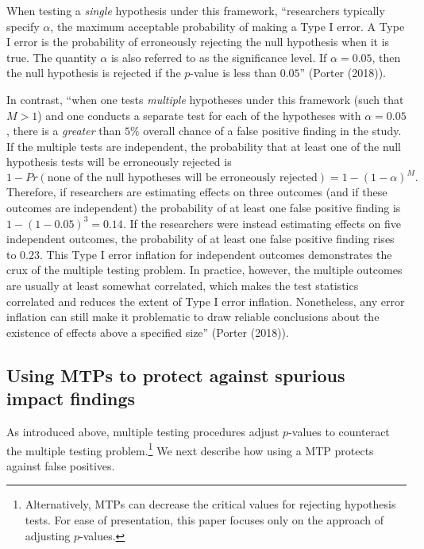 \documentclass[
]{article}
\begin{document}
When testing a \emph{single} hypothesis under this framework,
``researchers typically specify \(\alpha\), the maximum acceptable
probability of making a Type I error. A Type I error is the probability
of erroneously rejecting the null hypothesis when it is true. The
quantity \(\alpha\) is also referred to as the significance level. If
\(\alpha=0.05\), then the null hypothesis is rejected if the \(p\)-value
is less than \(0.05\)'' (Porter (2018)).

In contrast, ``when one tests \emph{multiple} hypotheses under this
framework (such that \(M>1\)) and one conducts a separate test for each
of the hypotheses with \(\alpha=0.05\), there is a \emph{greater} than
\(5\%\) overall chance of a false positive finding in the study. If the
multiple tests are independent, the probability that at least one of the
null hypothesis tests will be erroneously rejected is
\[1-Pr(\text{none of the null hypotheses will be erroneously rejected}) = 1-(1-\alpha)^M.\]
Therefore, if researchers are estimating effects on three outcomes (and
if these outcomes are independent) the probability of at least one false
positive finding is \(1-(1-0.05)^3=0.14\). If the researchers were
instead estimating effects on five independent outcomes, the probability
of at least one false positive finding rises to \(0.23\). This Type I
error inflation for independent outcomes demonstrates the crux of the
multiple testing problem. In practice, however, the multiple outcomes
are usually at least somewhat correlated, which makes the test
statistics correlated and reduces the extent of Type I error inflation.
Nonetheless, any error inflation can still make it problematic to draw
reliable conclusions about the existence of effects above a specified
size'' (Porter (2018)).

\subsection{Using MTPs to protect against spurious impact findings}
\label{sec:mtp_use}

As introduced above, multiple testing procedures adjust \(p\)-values to
counteract the multiple testing problem.\footnote{Alternatively, MTPs
  can decrease the critical values for rejecting hypothesis tests. For
  ease of presentation, this paper focuses only on the approach of
  adjusting \(p\)-values.} We next describe how using a MTP protects
against false positives.
\end{document}
